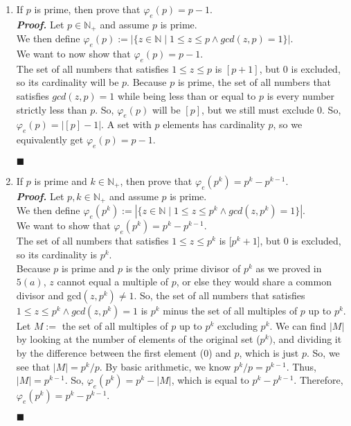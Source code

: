 \documentclass[11pt,a4paper]{article}
\begin{document}
\begin{enumerate}
\begin{enumerate}
        \item 
        If $p$ is prime, then prove that $\varphi_e (p) = p - 1 $. \\
        \emph{\textbf{Proof.}} Let $p \in \mathbb{N}_+$ and assume $p$ is prime. \\
        We then define $\varphi_e(p) := |\{z \in \mathbb{N} \mid 1 \leq z \leq p \land gcd(z, p) = 1 \}|  $. \\
        We want to now show that $\varphi_e(p) = p - 1 $. \\
        The set of all numbers that satisfies $1 \leq z \leq p $ is $[p + 1]$, but 0 is excluded, so its cardinality will be $p$. 
        Because $p$ is prime, the set of all numbers that satisfies $gcd (z, p) = 1 $ while being less than or equal to $p$ is every number strictly less than $p$. So, $\varphi_e(p)  $ will be $[p]$, but we still must exclude 0.
        So, $\varphi_e(p) = |[p] - 1 | $. A set with $p$ elements has cardinality $p$, so we equivalently get $\varphi_e(p) = p - 1 $.
        \begin{flushright}
            $\blacksquare$
        \end{flushright}

        \item 
        If $p$ is prime and $k \in \mathbb{N}_+ $, then prove that $\varphi_e (p^k) = p^k - p^{k - 1}$. \\
        \emph{\textbf{Proof.}} Let $p, k \in \mathbb{N}_+$ and assume $p$ is prime. \\
        We then define $\varphi_e(p^k) := |\{z \in \mathbb{N} \mid 1 \leq z \leq p^k \land gcd(z, p^k) = 1 \}| $. \\
        We want to show that $\varphi_e(p^k) = p^k - p^{k - 1} $. \\
        The set of all numbers that satisfies $1 \leq z \leq p^k $ is [$p^k + 1$], but 0 is excluded, so its cardinality is $p^k$. \\
        Because $p$ is prime and $p$ is the only prime divisor of $p^k$ as we proved in $5(a)$, $z $ cannot equal a multiple of $p$, or else they would share a common divisor and gcd$(z, p^k) \neq 1$. 
        So, the set of all numbers that satisfies $1 \leq z \leq p^k \land gcd(z, p^k) = 1 $ is $p^k $ minus the set of all multiples of $p$ up to $p^k$. 
        Let $M := $ the set of all multiples of $p$ up to $p^k$ excluding $p^k$. We can find $|M| $ by looking at the number of elements of the original set ($p^k)$, and dividing it by the difference between the first element (0) and $p$, which is just $p$.
        So, we see that $|M| = p^k / p $. By basic arithmetic, we know $p^k / p = p^{k - 1} $. Thus, $|M| = p^{k - 1} $. So, $\varphi_e(p^k) = p^k - |M| $, which is equal to $p^k - p^{k - 1} $.
        Therefore, $\varphi_e(p^k) = p^k - p^{k - 1} $.  
        \begin{flushright}
            $\blacksquare$
        \end{flushright} 

    \end{enumerate}
\end{enumerate}
\end{document}
